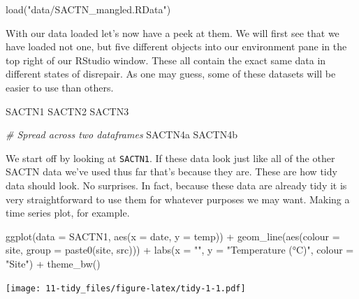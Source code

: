 \documentclass[
]{book}
\newenvironment{Shaded}{\begin{snugshade}}{\end{snugshade}}
\newcommand{\AttributeTok}[1]{\textcolor[rgb]{0.77,0.63,0.00}{#1}}
\newcommand{\CommentTok}[1]{\textcolor[rgb]{0.56,0.35,0.01}{\textit{#1}}}
\newcommand{\FunctionTok}[1]{\textcolor[rgb]{0.00,0.00,0.00}{#1}}
\newcommand{\NormalTok}[1]{#1}
\newcommand{\SpecialCharTok}[1]{\textcolor[rgb]{0.00,0.00,0.00}{#1}}
\newcommand{\StringTok}[1]{\textcolor[rgb]{0.31,0.60,0.02}{#1}}
\begin{document}
\begin{Shaded}
\begin{Highlighting}[]
\FunctionTok{load}\NormalTok{(}\StringTok{"data/SACTN\_mangled.RData"}\NormalTok{)}
\end{Highlighting}
\end{Shaded}

With our data loaded let's now have a peek at them. We will first see that we have loaded not one, but five different objects into our environment pane in the top right of our RStudio window. These all contain the exact same data in different states of disrepair. As one may guess, some of these datasets will be easier to use than others.

\begin{Shaded}
\begin{Highlighting}[]
\NormalTok{SACTN1}
\NormalTok{SACTN2}
\NormalTok{SACTN3}

\CommentTok{\# Spread across two dataframes}
\NormalTok{SACTN4a}
\NormalTok{SACTN4b}
\end{Highlighting}
\end{Shaded}

We start off by looking at \texttt{SACTN1}. If these data look just like all of the other SACTN data we've used thus far that's because they are. These are how tidy data should look. No surprises. In fact, because these data are already tidy it is very straightforward to use them for whatever purposes we may want. Making a time series plot, for example.

\begin{Shaded}
\begin{Highlighting}[]
\FunctionTok{ggplot}\NormalTok{(}\AttributeTok{data =}\NormalTok{ SACTN1, }\FunctionTok{aes}\NormalTok{(}\AttributeTok{x =}\NormalTok{ date, }\AttributeTok{y =}\NormalTok{ temp)) }\SpecialCharTok{+}
  \FunctionTok{geom\_line}\NormalTok{(}\FunctionTok{aes}\NormalTok{(}\AttributeTok{colour =}\NormalTok{ site, }\AttributeTok{group =} \FunctionTok{paste0}\NormalTok{(site, src))) }\SpecialCharTok{+}
  \FunctionTok{labs}\NormalTok{(}\AttributeTok{x =} \StringTok{""}\NormalTok{, }\AttributeTok{y =} \StringTok{"Temperature (°C)"}\NormalTok{, }\AttributeTok{colour =} \StringTok{"Site"}\NormalTok{) }\SpecialCharTok{+}
  \FunctionTok{theme\_bw}\NormalTok{()}
\end{Highlighting}
\end{Shaded}

\texttt{[image: 11-tidy\_files/figure-latex/tidy-1-1.pdf]}
\end{document}
